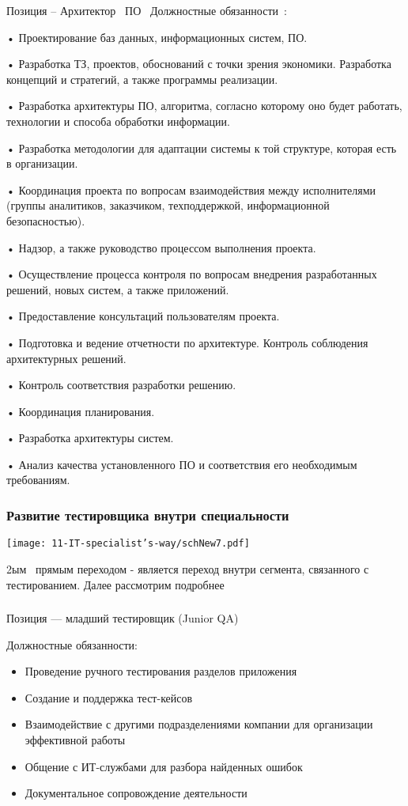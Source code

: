 \documentclass{../industrial-development}
\begin{document}
\lecturenotes

Позиция – Архитектор~\cite{hh} ПО~\cite{itcf}
Должностные обязанности~\cite{rab}: 

•	Проектирование баз данных, информационных систем, ПО. 

•	Разработка ТЗ, проектов, обоснований с точки зрения экономики. Разработка концепций и стратегий, а также программы реализации. 

•	Разработка архитектуры ПО, алгоритма, согласно которому оно будет работать, технологии и способа обработки информации. 

•	Разработка методологии для адаптации системы к той структуре, которая есть в организации. 

•	Координация проекта по вопросам взаимодействия между исполнителями (группы аналитиков, заказчиком, техподдержкой, информационной безопасностью). 

•	Надзор, а также руководство процессом выполнения проекта. 

•	Осуществление процесса контроля по вопросам внедрения разработанных решений, новых систем, а также приложений. 

•	Предоставление консультаций пользователям проекта. 

•	Подготовка и ведение отчетности по архитектуре. Контроль соблюдения архитектурных решений.

•	 Контроль соответствия разработки решению. 

•	Координация планирования.

•	 Разработка архитектуры систем. 

•	Анализ качества установленного ПО и соответствия его необходимым требованиям. 


\begin{frame} \frametitle{Развитие тестировщика внутри специальности }
  \centerline{\texttt{[image: 11-IT-specialist's-way/schNew7.pdf]}}
\end{frame}
\lecturenotes

 2ым~\cite{mc} прямым переходом  - является переход внутри сегмента, связанного с тестированием. Далее рассмотрим подробнее


\begin{frame} \frametitle{}
 \begin{block}{}
  \alert{Позиция --- младший тестировщик (Junior QA)}

Должностные обязанности: 
  \end{block}
  \begin{itemize}
  \item Проведение ручного тестирования разделов приложения
  \item Создание и поддержка тест-кейсов
  \item Взаимодействие с другими подразделениями компании для организации эффективной работы
 \item Общение с ИТ-службами для разбора найденных ошибок
\item Документальное сопровождение деятельности
  \end{itemize}
\end{frame}
\end{document}

